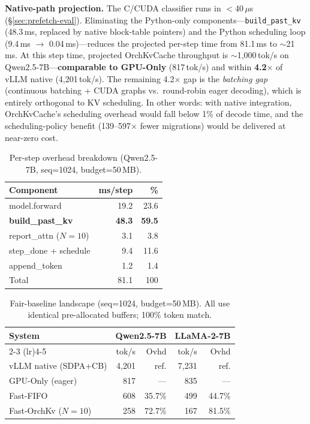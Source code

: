 \documentclass[conference]{IEEEtran}
\begin{document}
\textbf{Native-path projection.} The C/CUDA classifier runs in $<$40\,$\mu$s (\S\ref{sec:prefetch-eval}). Eliminating the Python-only components---\texttt{build\_past\_kv} (48.3\,ms, replaced by native block-table pointers) and the Python scheduling loop (9.4\,ms $\to$ 0.04\,ms)---reduces the projected per-step time from 81.1\,ms to ${\sim}$21\,ms. At this step time, projected OrchKvCache throughput is ${\sim}$1{,}000\,tok/s on Qwen2.5-7B---\textbf{comparable to GPU-Only} (817\,tok/s) and within \textbf{4.2$\times$} of vLLM native (4,201\,tok/s). The remaining 4.2$\times$ gap is the \emph{batching gap} (continuous batching + CUDA graphs vs.\ round-robin eager decoding), which is entirely orthogonal to KV scheduling. In other words: with native integration, OrchKvCache's scheduling overhead would fall below 1\% of decode time, and the scheduling-policy benefit (139--597$\times$ fewer migrations) would be delivered at near-zero cost.

\begin{table}[t]
\centering
\caption{Per-step overhead breakdown (Qwen2.5-7B, seq=1024, budget=50\,MB).}
\label{tab:overhead-breakdown}
\small
\setlength{\tabcolsep}{10pt}
\begin{tabular}{@{}lrr@{}}
\toprule
Component & ms/step & \% \\
\midrule
model.forward & 19.2 & 23.6 \\
\textbf{build\_past\_kv} & \textbf{48.3} & \textbf{59.5} \\
report\_attn ($N{=}10$) & 3.1 & 3.8 \\
step\_done + schedule & 9.4 & 11.6 \\
append\_token & 1.2 & 1.4 \\
\midrule
Total & 81.1 & 100 \\
\bottomrule
\end{tabular}
\end{table}

\begin{table}[t]
\centering
\caption{Fair-baseline landscape (seq=1024, budget=50\,MB). All use identical pre-allocated buffers; 100\% token match.}
\label{tab:fair-baseline}
\small
\setlength{\tabcolsep}{6pt}
\begin{tabular}{@{}lrrrr@{}}
\toprule
System & \multicolumn{2}{c}{Qwen2.5-7B} & \multicolumn{2}{c}{LLaMA-2-7B} \\
\cmidrule(lr){2-3} \cmidrule(lr){4-5}
& tok/s & Ovhd & tok/s & Ovhd \\
\midrule
vLLM native (SDPA+CB)  & 4{,}201 & ref. & 7{,}231 & ref. \\
GPU-Only (eager)        & 817 & --- & 835 & --- \\
Fast-FIFO               & 608 & 35.7\% & 499 & 44.7\% \\
Fast-OrchKv ($N{=}10$)  & 258 & 72.7\% & 167 & 81.5\% \\
\bottomrule
\end{tabular}
\end{table}
\end{document}
